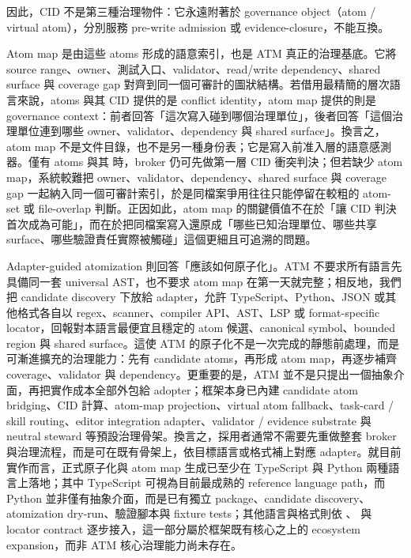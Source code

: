 \documentclass[a4paper,fontset=none]{ctexart}
\begin{document}
因此，CID 不是第三種治理物件：它永遠附著於 governance object（atom / virtual atom），分別服務 pre-write admission 或 evidence-closure，不能互換。

Atom map 是由這些 atoms 形成的語意索引，也是 ATM 真正的治理基底。它將 source range、owner、測試入口、validator、read/write dependency、shared surface 與 coverage gap 對齊到同一個可審計的圖狀結構。若借用最精簡的層次語言來說，atoms 與其 CID 提供的是 conflict identity，atom map 提供的則是 governance context：前者回答「這次寫入碰到哪個治理單位」，後者回答「這個治理單位連到哪些 owner、validator、dependency 與 shared surface」。換言之，atom map 不是文件目錄，也不是另一種身份表；它是寫入前准入層的語意感測器。僅有 atoms 與其 \texttt{} 時，broker 仍可先做第一層 CID 衝突判決；但若缺少 atom map，系統較難把 owner、validator、dependency、shared surface 與 coverage gap 一起納入同一個可審計索引，於是同檔案爭用往往只能停留在較粗的 atom-set 或 file-overlap 判斷。正因如此，atom map 的關鍵價值不在於「讓 CID 判決首次成為可能」，而在於把同檔案寫入還原成「哪些已知治理單位、哪些共享 surface、哪些驗證責任實際被觸碰」這個更細且可追溯的問題。

Adapter-guided atomization 則回答「應該如何原子化」。ATM 不要求所有語言先具備同一套 universal AST，也不要求 atom map 在第一天就完整；相反地，我們把 candidate discovery 下放給 adapter，允許 TypeScript、Python、JSON 或其他格式各自以 regex、scanner、compiler API、AST、LSP 或 format-specific locator，回報對本語言最便宜且穩定的 atom 候選、canonical symbol、bounded region 與 shared surface。這使 ATM 的原子化不是一次完成的靜態前處理，而是可漸進擴充的治理能力：先有 candidate atoms，再形成 atom map，再逐步補齊 coverage、validator 與 dependency。更重要的是，ATM 並不是只提出一個抽象介面，再把實作成本全部外包給 adopter；框架本身已內建 candidate atom bridging、CID 計算、atom-map projection、virtual atom fallback、task-card / skill routing、editor integration adapter、validator / evidence substrate 與 neutral steward 等預設治理骨架。換言之，採用者通常不需要先重做整套 broker 與治理流程，而是可在既有骨架上，依目標語言或格式補上對應 adapter。就目前實作而言，正式原子化與 atom map 生成已至少在 TypeScript 與 Python 兩種語言上落地；其中 TypeScript 可視為目前最成熟的 reference language path，而 Python 並非僅有抽象介面，而是已有獨立 \texttt{} package、candidate discovery、atomization dry-run、驗證腳本與 fixture tests；其他語言與格式則依 \texttt{}、\texttt{} 與 locator contract 逐步接入，這一部分屬於框架既有核心之上的 ecosystem expansion，而非 ATM 核心治理能力尚未存在。
\end{document}

